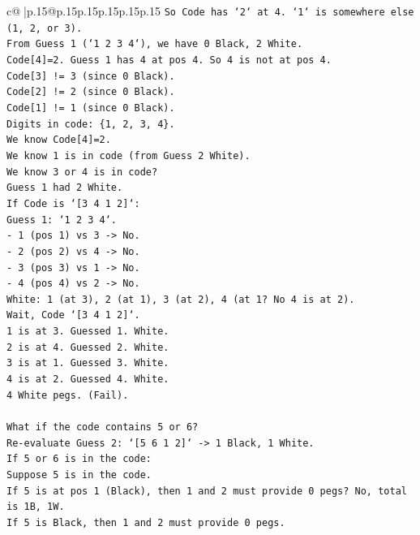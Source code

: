 \documentclass{article}
\begin{document}
{\begin{supertabular}{c@{$\;$}|p{.15\linewidth}@{}p{.15\linewidth}p{.15\linewidth}p{.15\linewidth}p{.15\linewidth}p{.15\linewidth}}
{{{\texttt{So Code has `2` at 4. `1` is somewhere else (1, 2, or 3).} \\
\texttt{From Guess 1 (`1 2 3 4`), we have 0 Black, 2 White.} \\
\texttt{Code{[}4{]}=2. Guess 1 has 4 at pos 4. So 4 is not at pos 4.} \\
\texttt{Code{[}3{]} != 3 (since 0 Black).} \\
\texttt{Code{[}2{]} != 2 (since 0 Black).} \\
\texttt{Code{[}1{]} != 1 (since 0 Black).} \\
\texttt{Digits in code: \{1, 2, 3, 4\}.} \\
\texttt{We know Code{[}4{]}=2.} \\
\texttt{We know 1 is in code (from Guess 2 White).} \\
\texttt{We know 3 or 4 is in code?} \\
\texttt{Guess 1 had 2 White.} \\
\texttt{If Code is `{[}3 4 1 2{]}`:} \\
\texttt{Guess 1: `1 2 3 4`.} \\
\texttt{{-} 1 (pos 1) vs 3 {-}> No.} \\
\texttt{{-} 2 (pos 2) vs 4 {-}> No.} \\
\texttt{{-} 3 (pos 3) vs 1 {-}> No.} \\
\texttt{{-} 4 (pos 4) vs 2 {-}> No.} \\
\texttt{White: 1 (at 3), 2 (at 1), 3 (at 2), 4 (at 1? No 4 is at 2).} \\
\texttt{Wait, Code `{[}3 4 1 2{]}`.} \\
\texttt{1 is at 3. Guessed 1. White.} \\
\texttt{2 is at 4. Guessed 2. White.} \\
\texttt{3 is at 1. Guessed 3. White.} \\
\texttt{4 is at 2. Guessed 4. White.} \\
\texttt{4 White pegs. (Fail).} \\
\\ 
\texttt{What if the code contains 5 or 6?} \\
\texttt{Re{-}evaluate Guess 2: `{[}5 6 1 2{]}` {-}> 1 Black, 1 White.} \\
\texttt{If 5 or 6 is in the code:} \\
\texttt{Suppose 5 is in the code.} \\
\texttt{If 5 is at pos 1 (Black), then 1 and 2 must provide 0 pegs? No, total is 1B, 1W.} \\
\texttt{If 5 is Black, then 1 and 2 must provide 0 pegs.} \\
}}}
\end{supertabular}}
\end{document}
